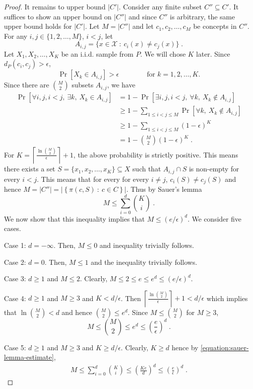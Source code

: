 \documentclass[11pt]{article}
\newcommand{\X}{\mathcal{X}}
\begin{document}
\begin{proof}
It remains to upper bound $|C'|$. Consider any finite subset $C'' \subseteq C'$.
It suffices to show an upper bound on $|C''|$ and since $C''$ is arbitrary, the
same upper bound holds for $|C'|$. Let $M = |C''|$ and let $c_1, c_2, \dots,
c_M$ be concepts in $C''$. For any $i,j \in \{1,2,\dots,M\}$, $i < j$, let
$$
A_{i,j} = \{ x \in \X ~:~ c_i(x) \neq c_j(x) \} \; .
$$
Let $X_1, X_2, \dots, X_K$ be an i.i.d. sample from $P$. We will chose $K$ later.
Since $d_P(c_i, c_j) > \epsilon$,
$$
\Pr[X_k \in A_{i,j}] > \epsilon \qquad \qquad \text{for $k=1,2,\dots,K$}.
$$
Since there are $\binom{M}{2}$ subsets $A_{i,j}$, we have
\begin{align*}
\Pr\left[\forall i,j, i < j, \ \exists k, \ X_k \in A_{i,j} \right]
& = 1 - \Pr\left[\exists i,j, i < j, \ \forall k, \ X_k \not \in A_{i,j} \right] \\
&  \ge 1 - \sum_{1 \le i < j \le M} \Pr\left[\forall k, \ X_k \not \in A_{i,j} \right] \\
&  \ge 1 - \sum_{1 \le i < j \le M} (1 - \epsilon)^K \\
& = 1 - \binom{M}{2} (1 - \epsilon)^K \; .
\end{align*}
For $K = \left\lceil \frac{\ln \binom{M}{2}}{\epsilon} \right\rceil +
1$, the above probability is strictly positive. This means there exists a set $S =
\{x_1, x_2, \dots, x_K\} \subseteq X$ such that $A_{i,j} \cap S$ is non-empty
for every $i < j$. This means that for every for every $i \neq j$, $c_i(S) \neq
c_j(S)$ and hence $M = |C''| = \left| \left\{ \pi(c, S) ~:~ c \in C \right\} \right|$.
Thus by Sauer's lemma
$$
M \le \sum_{i=0}^d \binom{K}{i} \; .
$$
We now show that this inequality implies that $M \le (e/\epsilon)^d$. We consider five cases.

Case 1: $d = -\infty$. Then, $M \le 0$ and inequality trivially follows.

Case 2: $d = 0$. Then, $M \le 1$ and the inequality trivially follows.

Case 3: $d \ge 1$ and $M \le 2$. Clearly, $M \le 2 \le e \le e^d \le (e/\epsilon)^d$.

Case 4: $d \ge 1$ and $M \ge 3$ and $K < d/\epsilon$. Then
$\left\lceil \frac{\ln \binom{M}{2}}{\epsilon} \right\rceil + 1 < d/\epsilon$
which implies that $\ln \binom{M}{2} < d$ and hence $\binom{M}{2} \le e^d$.
Since $M \le \binom{M}{2}$ for $M \ge 3$,
$$
M \le \binom{M}{2} \le e^d \le \left( \frac{e}{\epsilon} \right)^d \; .
$$

Case 5: $d \ge 1$ and $M \ge 3$ and $K \ge d/\epsilon$. Clearly, $K \ge d$ hence by \eqref{equation:sauer-lemma-estimate},
\begin{align*}
M
\le \sum_{i=0}^d \binom{K}{i}
\le \left( \frac{Ke}{d} \right)^d
\le \left( \frac{e}{\epsilon} \right)^d \; .
\end{align*}
\end{proof}
\end{document}
